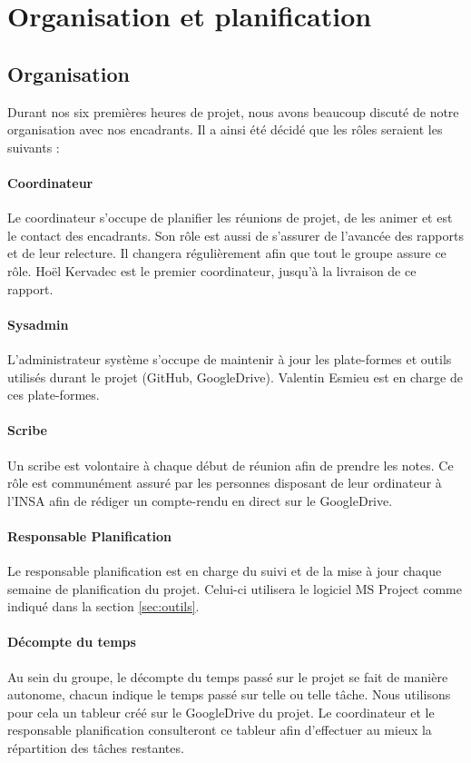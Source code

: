 \section{Organisation et planification}
	\subsection{Organisation}
	    Durant nos six premières heures de projet, nous avons beaucoup discuté de notre organisation avec nos encadrants. Il a ainsi été décidé que les rôles seraient les suivants :
	    \paragraph{Coordinateur} Le coordinateur s'occupe de planifier les réunions de projet, de les animer et est le contact des encadrants. Son rôle est aussi de s'assurer de l'avancée des rapports et de leur relecture. Il changera régulièrement afin que tout le groupe assure ce rôle. Hoël Kervadec est le premier coordinateur, jusqu'à la livraison de ce rapport.
	    \paragraph{Sysadmin} L'administrateur système s'occupe de maintenir à jour les plate-formes et outils utilisés durant le projet (GitHub, GoogleDrive). Valentin Esmieu est en charge de ces plate-formes.
	    \paragraph{Scribe} Un scribe est volontaire à chaque début de réunion afin de prendre les notes. Ce rôle est communément assuré par les personnes disposant de leur ordinateur à l'INSA afin de rédiger un compte-rendu en direct sur le GoogleDrive.
	    \paragraph{Responsable Planification} Le responsable planification est en charge du suivi et de la mise à jour chaque semaine de planification du projet. Celui-ci utilisera le logiciel MS Project comme indiqué dans la section \ref{sec:outils}.
	    \paragraph{Décompte du temps} Au sein du groupe, le décompte du temps passé sur le projet se fait de manière autonome, chacun indique le temps passé sur telle ou telle tâche. Nous utilisons pour cela un tableur créé sur le GoogleDrive du projet. Le coordinateur et le responsable planification consulteront ce tableur afin d'effectuer au mieux la répartition des tâches restantes.

